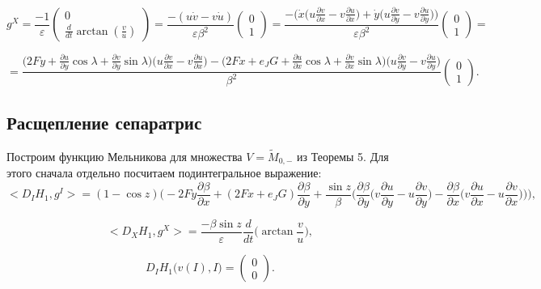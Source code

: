 $$g^X = \frac{-1}{\varepsilon} \begin{pmatrix}
  0 \\
  \frac d{dt} \arctan(\frac vu)
 \end{pmatrix}
 = 
 \frac{-(u \dot v - v \dot u)}{\varepsilon \beta^2} \begin{pmatrix}
  0 \\
  1
 \end{pmatrix}
 =
 \frac{-\Big(\dot x \big(u \frac{\partial v}{\partial x} - v \frac{\partial u}{\partial x} \big) + \dot y \big(u \frac{\partial v}{\partial y} - v \frac{\partial u}{\partial y}\big) \Big)}{\varepsilon \beta^2} \begin{pmatrix}
  0 \\
  1
 \end{pmatrix} = 
 $$
 
$$
 =
 \frac{\big(2Fy+\frac{\partial u}{\partial y} \cos \lambda + \frac{\partial v}{\partial y} \sin \lambda \big) \big(u \frac{\partial v}{\partial x} - v \frac{\partial u}{\partial x}\big) - \big(2Fx+e_JG +\frac{\partial u}{\partial x} \cos \lambda + \frac{\partial v}{\partial x} \sin \lambda \big) \big(u \frac{\partial v}{\partial y} - v \frac{\partial u}{\partial y} \big)}{\beta^2} \begin{pmatrix}
  0 \\
  1
 \end{pmatrix}.
 $$

\subsection{Расщепление сепаратрис}

Построим функцию Мельникова для множества $V=\tilde M_{0,-}$ из Теоремы 5.
Для этого сначала отдельно посчитаем подинтегральное выражение:
$$<D_IH_1, g^I> = (1 - \cos z) \Bigg( -2Fy \frac{\partial \beta}{\partial x}+(2Fx+e_J G)\frac{\partial \beta}{\partial y} + \frac{\sin z}{\beta} \bigg( 
\frac{\partial \beta}{\partial y}\Big(v \frac{\partial u}{\partial y}-u \frac{\partial v}{\partial y}\Big)-\frac{\partial \beta}{\partial x}\Big(v \frac{\partial u}{\partial x}-u \frac{\partial v}{\partial x} \Big)   \bigg)    \Bigg),$$

$$<D_XH_1,g^X> = \frac{- \beta  \sin z}{\varepsilon} \frac{d}{dt}{\Big( \arctan \frac{v}{u} \Big)},$$

$$D_I H_1 \big( v(I),I \big) = \begin{pmatrix}
  0 \\
  0
\end{pmatrix}.
$$

